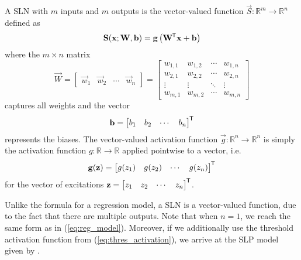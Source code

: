 \begin{definition}
    \label{def:sln}
    A SLN with $m$ inputs and $m$ outputs is the vector-valued function
    $\vec{S}: \mathbb{R}^m \rightarrow \mathbb{R}^n$ defined as
    \begin{equation}
        \label{eq:single_layer_perceptron}
        \mathbf{S}(\mathbf{x}; \mathbf{W}, \mathbf{b}) = \mathbf{g}\left( \mathbf{W}^{\mkern-1.5mu\mathsf{T}} \mathbf{x} + \mathbf{b} \right)
    \end{equation}
    where the  $m \times n$ matrix
    \begin{equation}
        \label{eq:sln_weight_matrix}
        \vec{W} = \begin{bmatrix}
            \vec{w}_1 & \vec{w}_2 & \cdots & \vec{w}_n
        \end{bmatrix} = \begin{bmatrix}
            w_{1,1} & w_{1,2} & \cdots & w_{1,n} \\
            w_{2,1} & w_{2,2} & \cdots & w_{2,n} \\
            \vdots & \vdots & \ddots & \vdots \\
            w_{m,1} & w_{m,2} & \cdots & w_{m,n}
        \end{bmatrix}
    \end{equation}
    captures all weights and the vector
    \begin{equation}
        \label{eq:sln_bias}
        \mathbf{b} = \begin{bmatrix}
            b_1 & b_2 & \cdots & b_n
        \end{bmatrix}^{\mkern-1.5mu\mathsf{T}}
    \end{equation}
    represents the biases.
    The vector-valued activation function $\vec{g} : \mathbb{R}^n \rightarrow \mathbb{R}^n$ is simply the activation function $g: \mathbb{R} \rightarrow \mathbb{R}$ applied pointwise to a vector, i.e.
    \begin{equation*}
        \mathbf{g}(\mathbf{z}) = \begin{bmatrix}
            g(z_1) & g(z_2) & \cdots & g(z_n)
        \end{bmatrix}^{\mkern-1.5mu\mathsf{T}}
    \end{equation*}
    for the vector of excitations
    $
        \mathbf{z} = \begin{bmatrix}
            z_1 & z_2 & \cdots & z_n
        \end{bmatrix}^{\mkern-1.5mu\mathsf{T}}
    $.
\end{definition}

Unlike the formula for a regression model, a SLN is a vector-valued function, due to the fact that there are multiple outputs. 
Note that when $n=1$, we reach the same form as in (\ref{eq:reg_model}). 
Moreover, if we additionally use the threshold activation function from (\ref{eq:thres_activation}), we arrive at the SLP model given by \citet{rosenblatt1958}.

